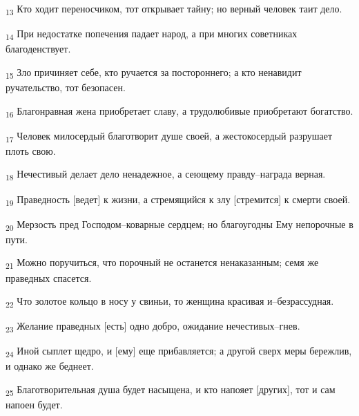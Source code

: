 \begin{tcolorbox}
\textsubscript{13} Кто ходит переносчиком, тот открывает тайну; но верный человек таит дело.
\end{tcolorbox}
\begin{tcolorbox}
\textsubscript{14} При недостатке попечения падает народ, а при многих советниках благоденствует.
\end{tcolorbox}
\begin{tcolorbox}
\textsubscript{15} Зло причиняет себе, кто ручается за постороннего; а кто ненавидит ручательство, тот безопасен.
\end{tcolorbox}
\begin{tcolorbox}
\textsubscript{16} Благонравная жена приобретает славу, а трудолюбивые приобретают богатство.
\end{tcolorbox}
\begin{tcolorbox}
\textsubscript{17} Человек милосердый благотворит душе своей, а жестокосердый разрушает плоть свою.
\end{tcolorbox}
\begin{tcolorbox}
\textsubscript{18} Нечестивый делает дело ненадежное, а сеющему правду--награда верная.
\end{tcolorbox}
\begin{tcolorbox}
\textsubscript{19} Праведность [ведет] к жизни, а стремящийся к злу [стремится] к смерти своей.
\end{tcolorbox}
\begin{tcolorbox}
\textsubscript{20} Мерзость пред Господом--коварные сердцем; но благоугодны Ему непорочные в пути.
\end{tcolorbox}
\begin{tcolorbox}
\textsubscript{21} Можно поручиться, что порочный не останется ненаказанным; семя же праведных спасется.
\end{tcolorbox}
\begin{tcolorbox}
\textsubscript{22} Что золотое кольцо в носу у свиньи, то женщина красивая и--безрассудная.
\end{tcolorbox}
\begin{tcolorbox}
\textsubscript{23} Желание праведных [есть] одно добро, ожидание нечестивых--гнев.
\end{tcolorbox}
\begin{tcolorbox}
\textsubscript{24} Иной сыплет щедро, и [ему] еще прибавляется; а другой сверх меры бережлив, и однако же беднеет.
\end{tcolorbox}
\begin{tcolorbox}
\textsubscript{25} Благотворительная душа будет насыщена, и кто напояет [других], тот и сам напоен будет.
\end{tcolorbox}
